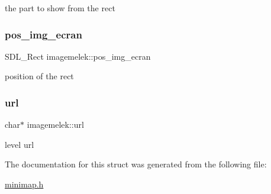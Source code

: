 the part to show from the rect \mbox{\label{structimagemelek_a331ba4a6496257d6cb505b9149a94d11}} 
\subsubsection{\texorpdfstring{pos\+\_\+img\+\_\+ecran}{pos\_img\_ecran}}
{\footnotesize\ttfamily S\+D\+L\+\_\+\+Rect imagemelek\+::pos\+\_\+img\+\_\+ecran}

position of the rect \mbox{\label{structimagemelek_a7185e3dc62b91db033944d7886294b23}} 
\subsubsection{\texorpdfstring{url}{url}}
{\footnotesize\ttfamily char$\ast$ imagemelek\+::url}

level url 

The documentation for this struct was generated from the following file\+:\begin{DoxyCompactItemize}
\item 
\hyperlink{minimap_8h}{minimap.\+h}\end{DoxyCompactItemize}

